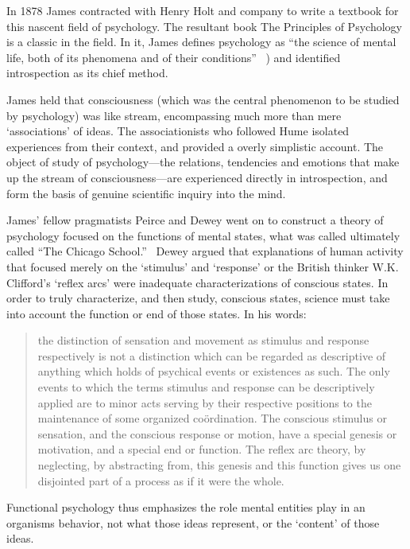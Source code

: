 \begin{refsection}
In 1878 James contracted with Henry Holt and company to write a textbook for this nascent field of psychology. The resultant book The Principles of Psychology is a classic in the field. In it, James defines psychology as ``the science of mental life, both of its phenomena and of their conditions'' ~\citep[p. 1]{James:1890wm}) and identified introspection as its chief method.

James held that consciousness (which was the central phenomenon to be studied by psychology) was like stream, encompassing much more than mere `associations' of ideas. The associationists who followed Hume isolated experiences from their context, and provided a overly simplistic account. The object of study of psychology---the relations, tendencies and emotions that make up the stream of consciousness---are experienced directly in introspection, and form the basis of genuine scientific inquiry into the mind.

James' fellow pragmatists Peirce and Dewey went on to construct a theory of psychology focused on the functions of mental states, what was called ultimately called ``The Chicago School.''~\citep{James:1904dz} Dewey argued that explanations of human activity that focused merely on the `stimulus' and `response' or the British thinker W.K. Clifford's `reflex arcs' were inadequate characterizations of conscious states. In order to truly characterize, and then study, conscious states, science must take into account the function or end of those states. In his words:

\begin{quote}

the distinction of sensation and movement as stimulus and response respectively is not a distinction which can be regarded as descriptive of anything which holds of psychical events or existences as such. The only events to which the terms stimulus and response can be descriptively applied are to minor acts serving by their respective positions to the maintenance of some organized coördination. The conscious stimulus or sensation, and the conscious response or motion, have a special genesis or motivation, and a special end or function. The reflex arc theory, by neglecting, by abstracting from, this genesis and this function gives us one disjointed part of a process as if it were the whole. ~\citep[p. 370]{Dewey:1896vt}
\end{quote}

Functional psychology thus emphasizes the role mental entities play in an organisms behavior, not what those ideas represent, or the `content' of those ideas.~\citep{Dewey:gu}~\citep{Dewey:1916tl}


\end{refsection}
